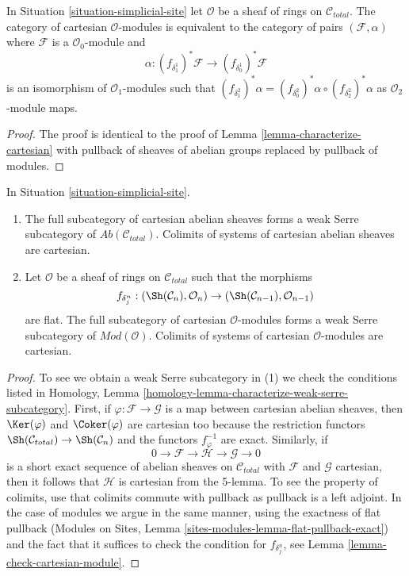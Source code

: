 \begin{lemma}
\label{lemma-characterize-cartesian-modules}
In Situation \ref{situation-simplicial-site}
let $\mathcal{O}$ be a sheaf of rings on $\mathcal{C}_{total}$.
The category of cartesian $\mathcal{O}$-modules
is equivalent to the category of pairs $(\mathcal{F}, \alpha)$
where $\mathcal{F}$ is a $\mathcal{O}_0$-module
and
$$
\alpha :
(f_{\delta_1^1})^*\mathcal{F}
\longrightarrow (f_{\delta_0^1})^*\mathcal{F}
$$
is an isomorphism of $\mathcal{O}_1$-modules such that
$(f_{\delta^2_1})^*\alpha =
(f_{\delta^2_0})^*\alpha \circ (f_{\delta^2_2})^*\alpha$
as $\mathcal{O}_2$-module maps.
\end{lemma}

\begin{proof}
The proof is identical to the proof of
Lemma \ref{lemma-characterize-cartesian}
with pullback of sheaves of abelian groups replaced
by pullback of modules.
\end{proof}

\begin{lemma}
\label{lemma-Serre-subcat-cartesian-modules}
In Situation \ref{situation-simplicial-site}.
\begin{enumerate}
\item The full subcategory of cartesian abelian sheaves forms a
weak Serre subcategory of $\textit{Ab}(\mathcal{C}_{total})$.
Colimits of systems of cartesian abelian sheaves are cartesian.
\item Let $\mathcal{O}$ be a sheaf of rings on $\mathcal{C}_{total}$
such that the morphisms
$$
f_{\delta^n_j} : (\Sh(\mathcal{C}_n), \mathcal{O}_n)
\to (\Sh(\mathcal{C}_{n - 1}), \mathcal{O}_{n - 1})
$$
are flat. The full subcategory of cartesian $\mathcal{O}$-modules forms a
weak Serre subcategory of $\textit{Mod}(\mathcal{O})$.
Colimits of systems of cartesian $\mathcal{O}$-modules are cartesian.
\end{enumerate}
\end{lemma}

\begin{proof}
To see we obtain a weak Serre subcategory in (1)
we check the conditions listed in
Homology, Lemma \ref{homology-lemma-characterize-weak-serre-subcategory}.
First, if $\varphi : \mathcal{F} \to \mathcal{G}$ is a map
between cartesian abelian sheaves, then
$\Ker(\varphi)$ and $\Coker(\varphi)$ are cartesian too
because the restriction functors
$\Sh(\mathcal{C}_{total}) \to \Sh(\mathcal{C}_n)$
and the functors $f_\varphi^{-1}$ are exact.
Similarly, if
$$
0 \to \mathcal{F} \to \mathcal{H} \to \mathcal{G} \to 0
$$
is a short exact sequence of abelian sheaves on $\mathcal{C}_{total}$
with $\mathcal{F}$ and $\mathcal{G}$ cartesian, then it follows that
$\mathcal{H}$ is cartesian from the 5-lemma. To see the property of
colimits, use that colimits commute with pullback as pullback is a
left adjoint. In the case of modules
we argue in the same manner, using the exactness of flat pullback
(Modules on Sites, Lemma \ref{sites-modules-lemma-flat-pullback-exact})
and the fact that it suffices to check the condition
for $f_{\delta^n_j}$, see Lemma \ref{lemma-check-cartesian-module}.
\end{proof}

